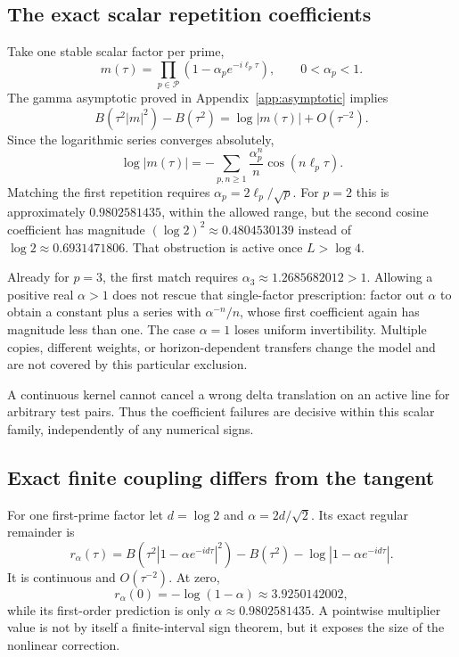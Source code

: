 \documentclass[11pt]{article}
\numberwithin{equation}{section}
\theoremstyle{definition}
\theoremstyle{remark}
\begin{document}
\subsection{The exact scalar repetition coefficients}
Take one stable scalar factor per prime,
\begin{equation}
 m(\tau)=\prod_{p\in\mathcal P}(1-\alpha_pe^{-i\ell_p\tau}),
 \qquad0<\alpha_p<1.
\end{equation}
The gamma asymptotic proved in Appendix~\ref{app:asymptotic} implies
\begin{equation}
 B(\tau^2|m|^2)-B(\tau^2)=\log|m(\tau)|+O(\tau^{-2}).
\end{equation}
Since the logarithmic series converges absolutely,
\begin{equation}
 \log|m(\tau)|=-\sum_{p,n\ge1}\frac{\alpha_p^n}{n}
 \cos(n\ell_p\tau).
 \label{eq:scalarcoeff}
\end{equation}
Matching the first repetition requires $\alpha_p=2\ell_p/\sqrt p$. For $p=2$ this is approximately $0.9802581435$, within the allowed range, but the second cosine coefficient has magnitude $(\log2)^2\approx0.4804530139$ instead of $\log2\approx0.6931471806$. That obstruction is active once $L>\log4$.

Already for $p=3$, the first match requires $\alpha_3\approx1.2685682012>1$. Allowing a positive real $\alpha>1$ does not rescue that single-factor prescription: factor out $\alpha$ to obtain a constant plus a series with $\alpha^{-n}/n$, whose first coefficient again has magnitude less than one. The case $\alpha=1$ loses uniform invertibility. Multiple copies, different weights, or horizon-dependent transfers change the model and are not covered by this particular exclusion.

A continuous kernel cannot cancel a wrong delta translation on an active line for arbitrary test pairs. Thus the coefficient failures are decisive within this scalar family, independently of any numerical signs.

\subsection{Exact finite coupling differs from the tangent}
For one first-prime factor let $d=\log2$ and $\alpha=2d/\sqrt2$. Its exact regular remainder is
\begin{equation}
 r_\alpha(\tau)=B(\tau^2|1-\alpha e^{-id\tau}|^2)
 -B(\tau^2)-\log|1-\alpha e^{-id\tau}|.
 \label{eq:ralpha}
\end{equation}
It is continuous and $O(\tau^{-2})$. At zero,
\begin{equation}
 r_\alpha(0)=-\log(1-\alpha)\approx3.9250142002,
\end{equation}
while its first-order prediction is only $\alpha\approx0.9802581435$. A pointwise multiplier value is not by itself a finite-interval sign theorem, but it exposes the size of the nonlinear correction.
\end{document}

